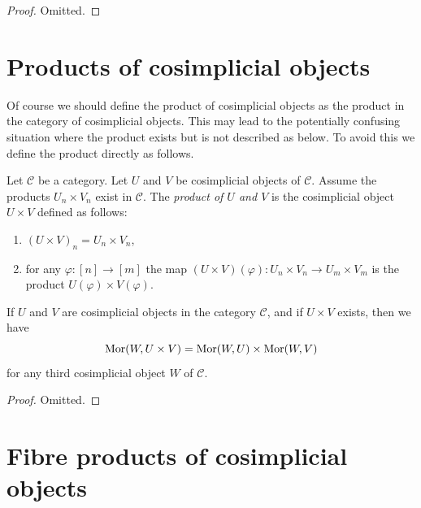 \begin{proof}
Omitted.
\end{proof}











\section{Products of cosimplicial objects}
\label{section-products-cosimplicial}

\noindent
Of course we should define the product of cosimplicial objects
as the product in the category of cosimplicial objects. This
may lead to the potentially confusing situation where the product exists
but is not described as below. To avoid this we define the product
directly as follows.

\begin{definition}
\label{definition-product-cosimplicial-objects}
Let $\mathcal{C}$ be a category.
Let $U$ and $V$ be cosimplicial objects of $\mathcal{C}$.
Assume the products $U_n \times V_n$ exist in $\mathcal{C}$.
The {\it product of $U$ and $V$} is the cosimplicial object
$U \times V$ defined as follows:
\begin{enumerate}
\item $(U \times V)_n = U_n \times V_n$,
\item for any $\varphi : [n] \to [m]$ the map
$(U \times V)(\varphi) : U_n \times V_n \to U_m \times V_m$
is the product $U(\varphi) \times V(\varphi)$.
\end{enumerate}
\end{definition}

\begin{lemma}
\label{lemma-product-cosimplicial-objects}
If $U$ and $V$ are cosimplicial objects in the category $\mathcal{C}$,
and if $U \times V$ exists, then we have
$$
\mathop{\mathrm{Mor}}\nolimits(W, U \times V) =
\mathop{\mathrm{Mor}}\nolimits(W, U) \times
\mathop{\mathrm{Mor}}\nolimits(W, V)
$$
for any third cosimplicial object $W$ of $\mathcal{C}$.
\end{lemma}

\begin{proof}
Omitted.
\end{proof}

\section{Fibre products of cosimplicial objects}
\label{section-fibre-products-cosimplicial}

